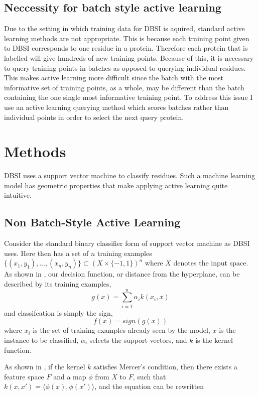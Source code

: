 \documentclass{article}
\begin{document}
\subsection*{Neccessity for batch style active learning}
Due to the setting in which training data for DBSI is aquired, standard active learning methods are not appropriate. This is because each training point given to DBSI corresponds to one residue in a protein. Therefore each protein that is labelled will give hundreds of new training points. Because of this, it is necessary to query training points in batches as opposed to querying individual residues. This makes active learning more difficult since the batch with the most informative set of training points, as a whole, may be different than the batch containing the one single most informative training point. To address this issue I use an active learning querying method which scores batches rather than individual points in order to select the next query protein.

     
\section*{Methods}
DBSI uses a support vector machine to classify residues. Such a machine learning model has geometric properties that make applying active learning quite intuitive. 

\subsection*{Non Batch-Style Active Learning}
Consider the standard binary classifier form  of support vector machine as DBSI uses.
Here then has a set of $n$ training examples
$
\{(x_1,y_1),...,(x_n, y_n)\} \subset (X \times \{-1,1\})^n
$ where $X$ denotes the input space. As shown in \cite{svm}, our decision function, or distance from the hyperplane, can be described by its training examples,
\[
g(x) = \sum_{i=1}^{n} \alpha_i k( x_i, x)
\]
and classifcation is simply the sign,
\[
	f(x) = sign(g(x))
\]
where $x_i$ is the set of training examples already seen by the model,
$x$ is the instance to be classified, $\alpha_i$ selects the support vectors, and $k$ is the kernel function.

As shown in \cite{active_learning}, if the kernel $k$ satisfies Mercer's condition, then there exists a feature space $F$ and a map $\phi$ from $X$ to $F$, such that $k(x,x') = \langle \phi(x) , \phi(x') \rangle$, and the equation can be rewritten 
 
\end{document}

